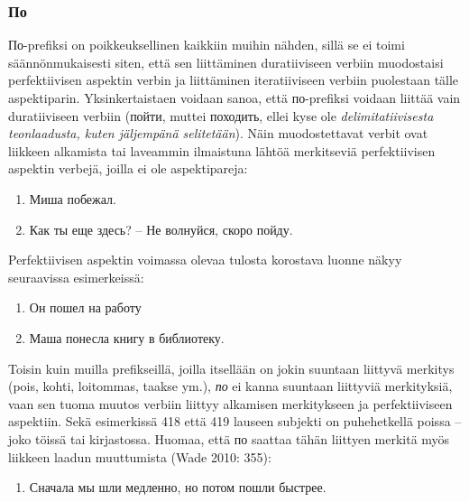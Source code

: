 \documentclass[]{scrartcl}
\providecommand{\tightlist}{%
  \setlength{\itemsep}{0pt}\setlength{\parskip}{0pt}}
\begin{document}
\subsubsection{По}\label{ux43fux43e}

По-prefiksi on poikkeuksellinen kaikkiin muihin nähden, sillä se ei
toimi säännönmukaisesti siten, että sen liittäminen duratiiviseen
verbiin muodostaisi perfektiivisen aspektin verbin ja liittäminen
iteratiiviseen verbiin puolestaan tälle aspektiparin. Yksinkertaistaen
voidaan sanoa, että по-prefiksi voidaan liittää vain duratiiviseen
verbiin (пойти, muttei походить, ellei kyse ole \emph{delimitatiivisesta
teonlaadusta, kuten jäljempänä selitetään}). Näin muodostettavat verbit
ovat liikkeen alkamista tai laveammin ilmaistuna lähtöä merkitseviä
perfektiivisen aspektin verbejä, joilla ei ole aspektipareja:

\begin{enumerate}
\def\labelenumi{(\arabic{enumi})}
\setcounter{enumi}{415}
\tightlist
\item
  Миша побежал.
\item
  Как ты еще здесь? -- Не волнуйся, скоро пойду.
\end{enumerate}

Perfektiivisen aspektin voimassa olevaa tulosta korostava luonne näkyy
seuraavissa esimerkeissä:

\begin{enumerate}
\def\labelenumi{(\arabic{enumi})}
\setcounter{enumi}{417}
\tightlist
\item
  Он пошел на работу
\item
  Маша понесла книгу в библиотеку.
\end{enumerate}

Toisin kuin muilla prefikseillä, joilla itsellään on jokin suuntaan
liittyvä merkitys (pois, kohti, loitommas, taakse ym.), \emph{по} ei
kanna suuntaan liittyviä merkityksiä, vaan sen tuoma muutos verbiin
liittyy alkamisen merkitykseen ja perfektiiviseen aspektiin. Sekä
esimerkissä 418 että 419 lauseen subjekti on puhehetkellä poissa -- joko
töissä tai kirjastossa. Huomaa, että по saattaa tähän liittyen merkitä
myös liikkeen laadun muuttumista (Wade 2010: 355):

\begin{enumerate}
\def\labelenumi{(\arabic{enumi})}
\setcounter{enumi}{419}
\tightlist
\item
  Сначала мы шли медленно, но потом пошли быстрее.
\end{enumerate}
\end{document}
